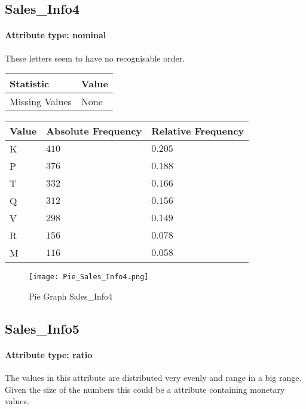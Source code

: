 \subsection{Sales\_Info4}
\paragraph{Attribute type: nominal} These letters seem to have no recognisable order.

\begin{table}[H]
	\renewcommand{\arraystretch}{1.25}
	\begin{tabular}{l|l}
		\textbf{Statistic} & \textbf{Value}\\\hline
		Missing Values& None\\\hline
	\end{tabular}
\end{table}
\begin{table}[H]
	\renewcommand{\arraystretch}{1.25}
	\begin{tabular}{l|l|l}
		\textbf{Value} & \textbf{Absolute Frequency} & \textbf{Relative Frequency}\\\hline
		K&$410$&$0.205$\\\hline
		P&$376$&$0.188$\\\hline
		T&$332$&$0.166$\\\hline
		Q&$312$&$0.156$\\\hline
		V&$298$&$0.149$\\\hline
		R&$156$&$0.078$\\\hline
		M&$116$&$0.058$
	\end{tabular}
\end{table}

\begin{figure}[H]
	\begin{center}
		\texttt{[image: Pie\_Sales\_Info4.png]}
	\end{center}
	\caption{Pie Graph Sales\_Info4}
\end{figure}

\subsection{Sales\_Info5}
\paragraph{Attribute type: ratio} The values in this attribute are distributed very evenly and range in a big range. Given the size of the numbers this could be a attribute containing monetary values.

